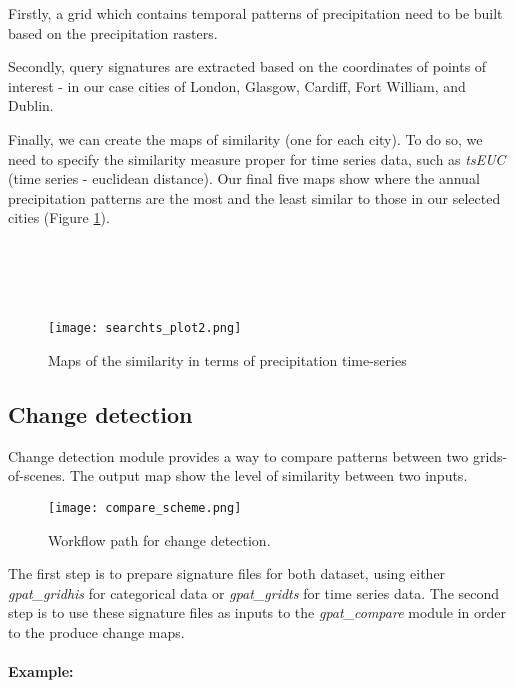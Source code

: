 Firstly, a grid which contains temporal patterns of precipitation need to be built based on the precipitation rasters.

Secondly, query signatures are extracted based on the coordinates of points of interest - in our case cities of London, Glasgow, Cardiff, Fort William, and Dublin. 

Finally, we can create the maps of similarity (one for each city). 
To do so, we need to specify the similarity measure proper for time series data, such as {\it tsEUC} (time series - euclidean distance).
Our final five maps show where the annual precipitation patterns are the most and the least similar to those in our selected cities (Figure \ref{FIG:SEARCHTS2}). \\\\\\\\\\

\begin{figure}[H]
        \begin{center}
	\texttt{[image: searchts\_plot2.png]}
	\caption{Maps of the similarity in terms of precipitation time-series}
	\label{FIG:SEARCHTS2}
        \end{center}
\end{figure}

\FloatBarrier

\subsection{Change detection}

Change detection module provides a way to compare patterns between two grids-of-scenes. 
The output map show the level of similarity between two inputs.
\begin{figure}[H]
	\centering
	\texttt{[image: compare\_scheme.png]}
	\caption{Workflow path for change detection.}
	\label{FIG:CHANGE}
\end{figure}

The first step is to prepare signature files for both dataset, using either {\it gpat\_gridhis} for categorical data or {\it gpat\_gridts} for time series data.
The second step is to use these signature files as inputs to the {\it gpat\_compare} module in order to the produce change maps. \\\\

{\bf Example:}

